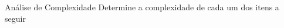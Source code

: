 \documentclass{FEIbeamer}
\begin{document}



\begin{frame}[fragile]{Análise de Complexidade}
    \large
    Determine a complexidade de cada um dos itens a seguir
\end{frame}

\begin{frame}[fragile]{\exercise}
\end{frame}

\begin{frame}[fragile]{\exercise}
\end{frame}

\begin{frame}[fragile]{\exercise}
\end{frame}

\begin{frame}[fragile]{\exercise}
\end{frame}
\end{document}

